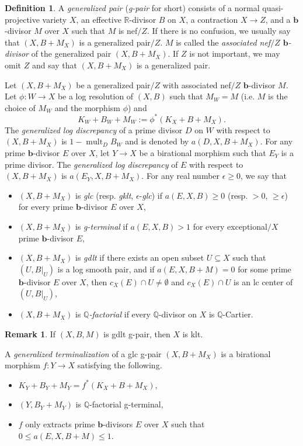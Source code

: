 \documentclass[11pt]{amsart}
\numberwithin{equation}{section}
\newcommand{\bb}{\bm{b}}
\newcommand{\Qq}{\mathbb{Q}}
\newcommand{\Rr}{\mathbb{R}}
\newcommand{\mult}{\operatorname{mult}}
\theoremstyle{definition}
\newtheorem{defn}[thm]{Definition}
\theoremstyle{definition}
\theoremstyle{definition}
\newtheorem{remark}[theorem]{Remark}
\begin{document}
\begin{defn}\label{defn: gpair} A \emph{generalized pair} (\emph{g-pair} for short) consists of a normal quasi-projective variety $X$, an effective $\Rr$-divisor $B$ on $X$, a contraction $X\rightarrow Z$, and a $\bb$-divisor $M$ over $X$ such that $M$ is nef$/Z$. If there is no confusion, we usually say that $(X,B+M_X)$ is a generalized pair$/Z$. $M$ is called the \emph{associated nef$/Z$ $\bb$-divisor} of the generalized pair $(X,B+M_X)$. If $Z$ is not important, we may omit $Z$ and say that $(X,B+M_X)$ is a generalized pair.

Let $(X,B+M_X)$ be a generalized pair$/Z$ with associated nef$/Z$ $\bb$-divisor $M$. Let $\phi:W\to X$
	be a log resolution of $(X,B)$ such that $M_W=M$ (i.e. $M$ is the choice of $M_W$ and the morphism $\phi$) and
	$$K_W+B_W+M_W:=\phi^{*}(K_X+B+M_X).$$
	The \emph{generalized log discrepancy} of a prime divisor $D$ on $W$ with respect to $(X,B+M_X)$ is $1-\mult_{D}B_W$ and is denoted by $a(D,X,B+M_X).$ For any prime $\bb$-divisor $E$ over $X$, let $Y\rightarrow X$ be a birational morphism such that $E_Y$ is a prime divisor.  The \emph{generalized log discrepancy} of $E$ with respect to $(X,B+M_X)$ is $a(E_Y,X,B+M_X)$.
	For any real number $\epsilon\geq 0$, we say that
	\begin{itemize}
	    \item $(X,B+M_X)$ is \emph{glc} (resp. \emph{gklt}, $\epsilon$-\emph{glc}) if $a(E,X,B)\ge0$ (resp. $>0$, $\ge\epsilon$) for every prime $\bb$-divisor $E$ over $X$,
	    \item  $(X,B+M_X)$ is \emph{g-terminal} if $a(E,X,B)>1$ for every exceptional$/X$ prime $\bb$-divisor $E$,
	    \item $(X,B+M_X)$ is \emph{gdlt} if there exists an open subset $U \subseteq X$ such that $(U,B|_U)$ is a log smooth pair, and if $ a(E,X,B+M) = 0 $ for some prime $\bb$-divisor $E$  over $X$, then $ c_X(E) \cap U \neq \emptyset $ and $ c_X(E) \cap U $ is an lc center of $(U,B|_U)$,
	    \item $(X,B+M_X)$ is \emph{$\Qq$-factorial} if every $\Qq$-divisor on $X$ is $\Qq$-Cartier.
	\end{itemize}
\end{defn}
\begin{remark}
  If $(X,B,M)$ is gdlt g-pair, then $X$ is klt.
\end{remark}

A \emph{generalized terminalization} of a glc g-pair $(X,B+M_X)$ is a birational morphism $f: Y\rightarrow X$ satisfying the following.
\begin{itemize}
    \item $K_Y+B_Y+M_Y=f^*(K_X+B+M_X)$,
    \item $(Y,B_Y+M_Y)$ is $\Qq$-factorial g-terminal,
    \item $f$ only extracts prime $\bb$-divisors $E$ over $X$ such that $0\leq a(E,X,B+M)\leq 1$.
\end{itemize}
\end{document}
